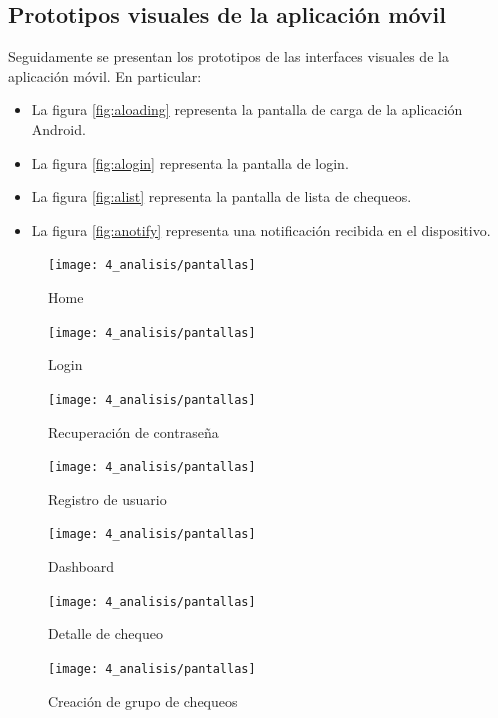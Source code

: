 \subsection{Prototipos visuales de la aplicación móvil}

Seguidamente se presentan los prototipos de las interfaces visuales de la
aplicación móvil. En particular:

\begin{itemize}
\item La figura \ref{fig:aloading} representa la pantalla de carga de la aplicación Android.
\item La figura \ref{fig:alogin} representa la pantalla de login.
\item La figura \ref{fig:alist} representa la pantalla de lista de chequeos.
\item La figura \ref{fig:anotify} representa una notificación recibida en el dispositivo.
\end{itemize}


\begin{figure}[htbp]
  \centering
  \texttt{[image: 4\_analisis/pantallas]}
  \caption{Home}
  \label{fig:phome}
\end{figure}

\begin{figure}[htbp]
  \centering
  \texttt{[image: 4\_analisis/pantallas]}
  \caption{Login}
  \label{fig:plogin}
\end{figure}

\begin{figure}[htbp]
  \centering
  \texttt{[image: 4\_analisis/pantallas]}
  \caption{Recuperación de contraseña}
  \label{fig:ppassword}
\end{figure}

\begin{figure}[htbp]
  \centering
  \texttt{[image: 4\_analisis/pantallas]}
  \caption{Registro de usuario}
  \label{fig:pregister}
\end{figure}

\begin{figure}[htbp]
  \centering
  \texttt{[image: 4\_analisis/pantallas]}
  \caption{Dashboard}
  \label{fig:pdashboard}
\end{figure}

\begin{figure}[htbp]
  \centering
  \texttt{[image: 4\_analisis/pantallas]}
  \caption{Detalle de chequeo}
  \label{fig:pdetail}
\end{figure}

\begin{figure}[htbp]
  \centering
  \texttt{[image: 4\_analisis/pantallas]}
  \caption{Creación de grupo de chequeos}
  \label{fig:pnewgroup}
\end{figure}


